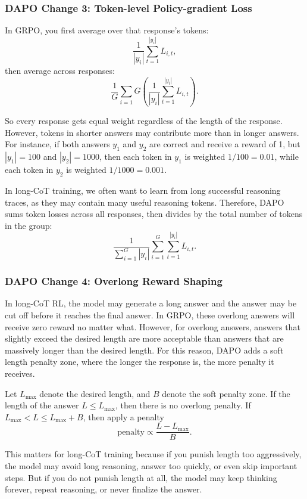 \subsubsection{DAPO Change 3: Token-level Policy-gradient Loss}

In GRPO, you first average over that response's tokens:
\[
	\frac{1}{|y_i|} \sum_{t = 1}^{|y_i|}{ L_{i,t} },
\]
then average across responses:
\[
	\frac{1}{G}\sum_{i = 1}{G} \left( \frac{1}{|y_i|} \sum_{t = 1}^{|y_i|}{ L_{i,t} } \right).
\]

So every response gets equal weight regardless of the length of the response. However, tokens in shorter answers may contribute more than in longer answers. For instance, if both answers \(y_1\) and \(y_2\) are correct and receive a reward of 1, but \(|y_1| = 100\) and \(|y_2| = 1000\), then each token in \(y_1\) is weighted \(1/100 = 0.01\), while each token in \(y_2\) is weighted \(1/1000 = 0.001\).

In long-CoT training, we often want to learn from long successful reasoning traces, as they may contain many useful reasoning tokens. Therefore, DAPO sums token losses across all responses, then divides by the total number of tokens in the group:
\[
	\frac{1}{\sum_{i=1}^{G}|y_i|} \sum_{i=1}^{G} \sum_{t=1}^{|y_i|} L_{i,t}.
\]

\subsubsection{DAPO Change 4: Overlong Reward Shaping}

In long-CoT RL, the model may generate a long answer and the answer may be cut off before it reaches the final answer. In GRPO, these overlong answers will receive zero reward no matter what. However, for overlong answers, answers that slightly exceed the desired length are more acceptable than answers that are massively longer than the desired length. For this reason, DAPO adds a soft length penalty zone, where the longer the response is, the more penalty it receives.

Let \(L_\text{max}\) denote the desired length, and \(B\) denote the soft penalty zone. If the length of the answer \(L \le L_\text{max}\), then there is no overlong penalty. If \(L_\text{max} < L \le L_\text{max} + B\), then apply a penalty
\[
	\text{penalty} \propto \frac{L - L_\text{max}}{B}.
\]

This matters for long-CoT training because if you punish length too aggressively, the model may avoid long reasoning, answer too quickly, or even skip important steps. But if you do not punish length at all, the model may keep thinking forever, repeat reasoning, or never finalize the answer.
